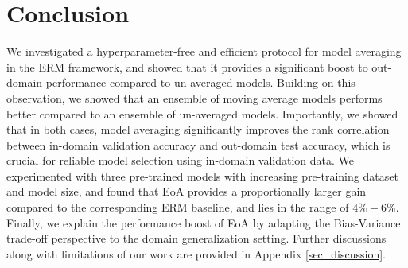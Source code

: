 \documentclass{article}
\begin{document}
\section{Conclusion}
\vspace{-5pt}
We investigated a hyperparameter-free and efficient protocol for model averaging in the ERM framework, and showed that it provides a significant boost to out-domain performance compared to un-averaged models. Building on this observation, we showed that an ensemble of moving average models performs better compared to an ensemble of un-averaged models. Importantly, we showed that in both cases, model averaging significantly improves the rank correlation between in-domain validation accuracy and out-domain test accuracy, which is crucial for reliable model selection using in-domain validation data. We experimented with three pre-trained models with increasing pre-training dataset and model size, and found that EoA provides a proportionally larger gain compared to the corresponding ERM baseline, and lies in the range of $4\%-6\%$. Finally, we explain the performance boost of EoA by adapting the Bias-Variance trade-off perspective to the domain generalization setting. Further discussions along with limitations of our work are provided in Appendix \ref{sec_discussion}.






\end{document}
